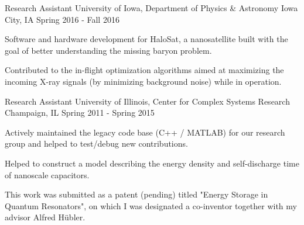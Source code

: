 \begin{cventries}
\cventry
  {Research Assistant} %
  {University of Iowa, Department of Physics \& Astronomy} %
  {Iowa City, IA} %
  {Spring 2016 - Fall 2016} %
  {
      \begin{cvitems} %
          \item {Software and hardware development for HaloSat, a
                  nanosatellite built with the goal of better understanding
                  the missing baryon problem.}
          \item {Contributed to the in-flight optimization algorithms aimed at
                  maximizing the incoming X-ray signals (by minimizing
                  background noise) while in operation.}
      \end{cvitems}
  }

  \cventry
  {Research Assistant} %
  {University of Illinois, Center for Complex Systems Research} %
  {Champaign, IL}
  {Spring 2011 - Spring 2015}
  {
      \begin{cvitems} 
          \item {Actively maintained the legacy code base (C++ / MATLAB) for our
                  research group and helped to test/debug new contributions.}
          \item {Helped to construct a model describing the energy density and
                  self-discharge time of nanoscale capacitors.}
          \item {This work was submitted as a patent (pending) titled "Energy
                  Storage in Quantum Resonators", on which I was designated a
                  co-inventor together with my advisor Alfred H\"ubler.}
      \end{cvitems}
  }

\end{cventries}
